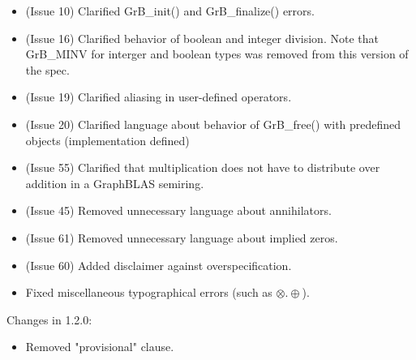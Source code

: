 \begin{itemize}
\item (Issue 10) Clarified {\sf GrB\_init()} and {\sf GrB\_finalize()} errors.
\item (Issue 16) Clarified behavior of boolean and integer division. {\color{red} Note that {\sf GrB\_MINV} for interger and boolean types was removed from this version of the spec.}
\item (Issue 19) Clarified aliasing in user-defined operators.
\item (Issue 20) Clarified language about behavior of {\sf GrB\_free()} with predefined objects (implementation defined)
\item (Issue 55) Clarified that multiplication does not have to distribute over addition in a GraphBLAS semiring.
\item (Issue 45) Removed unnecessary language about annihilators.
\item (Issue 61) Removed unnecessary language about implied zeros.
\item (Issue 60) Added disclaimer against overspecification.
\item Fixed miscellaneous typographical errors (such as $\otimes.\oplus$).
\end{itemize}


Changes in 1.2.0:
\begin{itemize}
\item Removed "provisional" clause.
\end{itemize}



